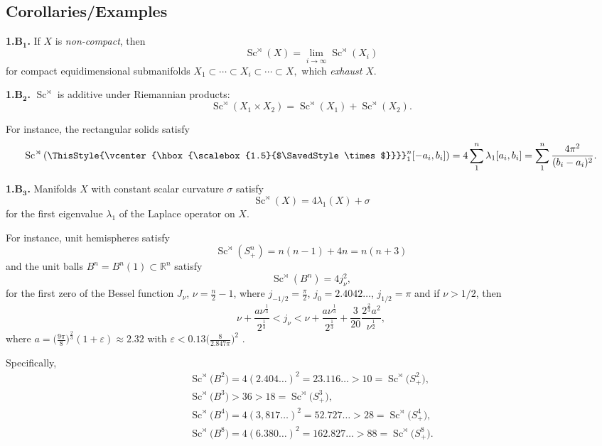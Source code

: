 \documentclass[10pt,a4paper]{amsart}
\numberwithin{equation}{section}
\newcommand\bigtimes{\mathbin{\ThisStyle{\vcenter{\hbox{%
\scalebox{1.5}{$\SavedStyle\times$}}}}}}
\begin{document}
\subsection*{Corollaries/Examples}

\textbf{1.B$\boldsymbol{{}_1}$.} If $X$ is {\it non-compact}, then
\[
\operatorname{Sc}^\rtimes(X) =\lim_{i\to\infty} \operatorname{Sc}^\rtimes(X_i)
\]
for compact equidimensional submanifolds
$X_1\subset \cdots \subset X_i\subset \cdots \subset X,$
which {\it exhaust} $X$.

 \textbf{1.B$\boldsymbol{{}_2}$.} $\operatorname{Sc}^\rtimes $ is additive under Riemannian products:
\[
\operatorname{Sc}^\rtimes (X_1\times X_2)=\operatorname{Sc}^\rtimes (X_1) + \operatorname{Sc}^\rtimes (X_2).
\]

For instance, the rectangular solids satisfy
\[
\operatorname{Sc}^{\rtimes}\left( \bigtimes_1^n[-a_i,b_i]\right)=4\sum_1^n \lambda_1[a_i,b_i]=
\sum_1^n \frac {4\pi^2}{(b_i-a_i)^2}.
\]

 \textbf{1.B$\boldsymbol{{}_3}$.} Manifolds $X$ with constant scalar curvature $\sigma$ satisfy
\[
\operatorname{Sc}^\rtimes(X)=4\lambda_1(X)+\sigma
\]
 for the first eigenvalue $\lambda_1$ of the Laplace operator on $X$.

 For instance,
 unit hemispheres satisfy
\[
\operatorname{Sc}^\rtimes  (S^n_+ )=n(n-1)+4n=n(n+3)
\]
 and the unit balls $B^n=B^n(1)\subset \mathbb R^n$ satisfy
\[
\operatorname{Sc}^\rtimes (B^n)=4j_\nu^2,
\]
 for the first zero of the Bessel function $J_\nu$, $\nu=\frac {n}{2}-1$, where
 $j_{-1/2}=\frac{\pi}{2}$, $j_0=2.4042\dots$, $j_{1/2}=\pi$ and if $\nu>1/2$, then{\samepage
\[
\nu+\frac{a \nu^\frac{1}{3}}{2^\frac{1}{3}}<j_\nu<
\nu+\frac{a \nu^\frac{1}{3}}{2^\frac{1}{3}}+\frac{3}{20}\frac{2^\frac{2}{3}a^2}{\nu^\frac{1}{2}},
\]
 where $a=\bigl(\frac {9\pi}{8} \bigr)^\frac{2}{3}(1+\varepsilon)\approx 2.32$ with
 $\varepsilon< 0.13\bigl(\frac {8}{2.847\pi}\bigr)^{2}$ \cite{QW1999}.}


Specifically,
\begin{gather*}\operatorname{Sc}^\rtimes \bigl(B^2\bigr)=4(2.404\dots)^2=23.116\ldots>10=\operatorname{Sc}^\rtimes \bigl(S^2_+\bigr),\\
\operatorname{Sc}^\rtimes \bigl(B^3\bigr)>36>18=\operatorname{Sc}^\rtimes \bigl(S^3_+\bigr),\\
\operatorname{Sc}^\rtimes \bigl(B^4\bigr)=4(3,817\dots)^2=52.727\ldots>28=\operatorname{Sc}^\rtimes \bigl(S^4_+\bigr),\\
\operatorname{Sc}^\rtimes \bigl(B^8\bigr)=4(6.380\dots)^2= 162.827\ldots>88 =\operatorname{Sc}^\rtimes \bigl(S^8_+\bigr).
\end{gather*}
\end{document}
